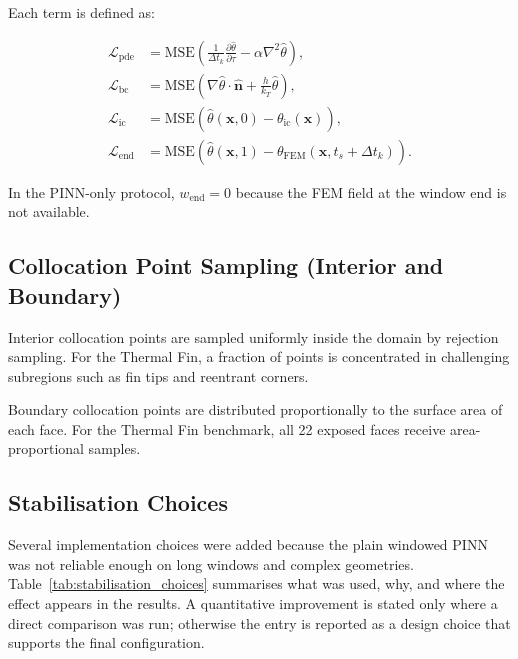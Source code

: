 Each term is defined as:

\begin{align}
\mathcal{L}_\mathrm{pde}
&= \mathrm{MSE}\!\left(
   \frac{1}{\Delta t_k}\frac{\partial\hat\theta}{\partial\tau}
   - \alpha\nabla^2\hat\theta
   \right),
\label{eq:lpde2}\\[4pt]
\mathcal{L}_\mathrm{bc}
&= \mathrm{MSE}\!\left(
   \nabla\hat\theta\cdot\hat{\mathbf{n}}
   + \frac{h}{k_T}\hat\theta
   \right),
\label{eq:lbc2}\\[4pt]
\mathcal{L}_\mathrm{ic}
&= \mathrm{MSE}\!\left(
   \hat\theta(\mathbf{x},0) - \theta_\mathrm{ic}(\mathbf{x})
   \right),
\label{eq:lic2}\\[4pt]
\mathcal{L}_\mathrm{end}
&= \mathrm{MSE}\!\left(
   \hat\theta(\mathbf{x},1) - \theta_\mathrm{FEM}(\mathbf{x},t_s+\Delta t_k)
   \right).
\label{eq:lend2}
\end{align}

In the PINN-only protocol, $w_\mathrm{end}=0$ because the FEM field at the
window end is not available.

\subsection{Collocation Point Sampling (Interior and Boundary)}

Interior collocation points are sampled uniformly inside the domain by
rejection sampling.
For the Thermal Fin, a fraction of points is concentrated in challenging
subregions such as fin tips and reentrant corners.

Boundary collocation points are distributed proportionally to the surface area
of each face.
For the Thermal Fin benchmark, all 22 exposed faces receive area-proportional
samples.

\subsection{Stabilisation Choices}
\label{subsec:stabilisation_choices}

Several implementation choices were added because the plain windowed PINN
was not reliable enough on long windows and complex geometries.
Table~\ref{tab:stabilisation_choices} summarises what was used, why, and
where the effect appears in the results.
A quantitative improvement is stated only where a direct comparison was run;
otherwise the entry is reported as a design choice that supports the final
configuration.

